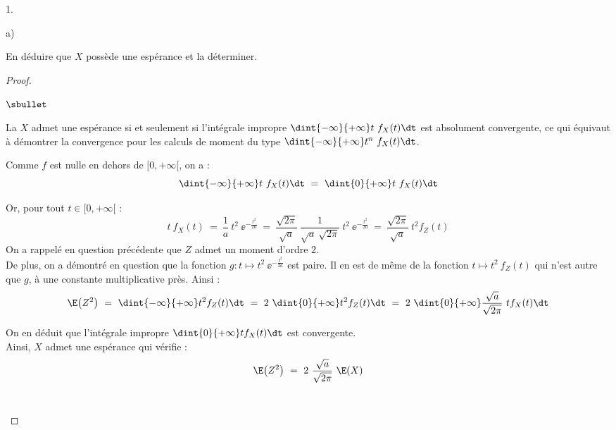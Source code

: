 \begin{noliste}{1.}
\begin{noliste}{a)}
  \item En déduire que $X$ possède une espérance et la déterminer.

    \begin{proof}~%
      \begin{noliste}{$\sbullet$}
      \item La \var $X$ admet une espérance si et seulement si
        l'intégrale impropre $\dint{-\infty}{+\infty} t \ f_X(t) \dt$
        est absolument convergente, ce qui équivaut à démontrer la
        convergence pour les calculs de moment du type
        $\dint{-\infty}{+\infty} t^n \ f_X(t) \dt$.


        \newpage


      \item Comme $f$ est nulle en dehors de $[0, +\infty[$, on a :
        \[
        \dint{-\infty}{+\infty} t \ f_X(t) \dt \ = \ \dint{0}{+\infty}
        t \ f_X(t) \dt
        \]        

      \item Or, pour tout $t \in [0, +\infty[$ :
        \[
        t \ f_X(t) \ = \ \dfrac{1}{a} \ t^2 \ \ee^{-\frac{t^2}{2a}} \
        = \ \dfrac{\sqrt{2 \pi}}{\sqrt{a}} \ \dfrac{1}{\sqrt{a} \
          \sqrt{2 \pi}} \ t^2 \ \ee^{-\frac{t^2}{2a}} \ = \
        \dfrac{\sqrt{2 \pi}}{\sqrt{a}} \ t^2 f_Z(t)
        \]
        On a rappelé en question précédente que $Z$ admet un moment
        d'ordre $2$.\\
        De plus, on a démontré en question  que la fonction
        $g : t \mapsto t^2 \ \ee^{-\frac{t^2}{2a}}$ est paire. Il en est
        de même de la fonction $t \mapsto t^2 \ f_Z(t)$ qui n'est
        autre que $g$, à une constante multiplicative près. Ainsi :
        \[
        \E\big( Z^2 \big) \ = \ \dint{-\infty}{+\infty} t^2 f_Z(t) \dt
        \ = \ 2 \ \dint{0}{+\infty} t^2 f_Z(t) \dt \ = \ 2 \
        \dint{0}{+\infty} \dfrac{\sqrt{a}}{\sqrt{2 \pi}} \ t f_X(t)
        \dt
        \]

      \item On en déduit que l'intégrale impropre $\dint{0}{+\infty} t
        f_X(t) \dt$ est convergente. \\[.1cm]
        Ainsi, $X$ admet une espérance qui vérifie :
        \[
        \E\big( Z^2 \big) \ = \ 2 \ \dfrac{\sqrt{a}}{\sqrt{2 \pi}} \ \E(X)
        \]
        ~\\[-1.2cm]
      \end{noliste}
    \end{proof}
  \end{noliste}


\end{noliste}
